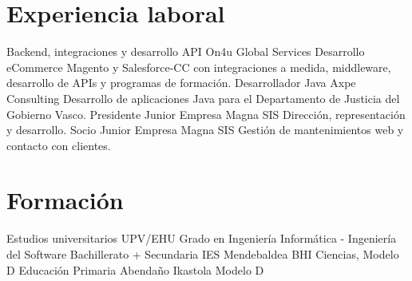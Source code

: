\documentclass[letterpaper]{twentysecondcv} %
\begin{document}

\section{Experiencia laboral}

\begin{twenty} %
	    {Backend, integraciones y desarrollo API}
    	{On4u Global Services}
    	{Desarrollo eCommerce Magento y Salesforce-CC con integraciones a medida, middleware, desarrollo de APIs y programas de formación.}
	    {Desarrollador Java}
    	{Axpe Consulting}
    	{Desarrollo de aplicaciones Java para el Departamento de Justicia del Gobierno Vasco.}
	    {Presidente}
    	{Junior Empresa Magna SIS}
    	{Dirección, representación y desarrollo.}
	    {Socio}
    	{Junior Empresa Magna SIS} 
    	{Gestión de mantenimientos web y contacto con clientes.}
\end{twenty}


\section{Formación}

\begin{twenty} %
	{Estudios universitarios}
	{UPV/EHU}
	{Grado en Ingeniería Informática - Ingeniería del Software}
	{Bachillerato + Secundaria}
	{IES Mendebaldea BHI}
	{Ciencias, Modelo D}
	{Educación Primaria}
	{Abenda\~no Ikastola}
	{Modelo D}
\end{twenty}
\end{document}
